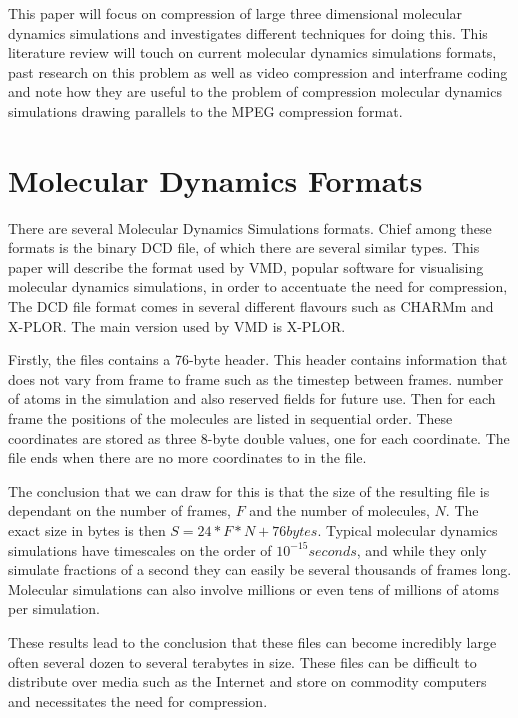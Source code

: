 \documentclass[twocolumn, a4paper,10pt]{article}
\begin{document}
This paper will focus on compression of large three dimensional molecular dynamics simulations and investigates different techniques for doing this. This literature review will touch on current molecular dynamics simulations formats, past research on this problem as well as video compression and interframe coding and note how they are useful to the problem of compression molecular dynamics simulations drawing parallels to the MPEG compression format. 

\section*{Molecular Dynamics Formats}

There are several Molecular Dynamics Simulations formats. Chief among these formats is the binary DCD file, of which there are several similar types. This paper will describe the format  used by VMD, popular software for visualising molecular dynamics simulations\cite{vmd}, in order to accentuate the need for compression, The DCD file format comes in several different flavours such as CHARMm and X-PLOR. The main version used by VMD is X-PLOR\cite{vmddcdformat}.

Firstly, the files contains a 76-byte header. This header contains information that does not vary from frame to frame such as the timestep between frames. number of atoms in the simulation and also reserved fields for future use. Then for each frame the positions of the molecules are listed in sequential order. These coordinates are stored as three 8-byte double values, one for each coordinate. The file ends when there are no more coordinates to in the file.

The conclusion that we can draw for this is that the size of the resulting file is dependant on the number of frames, $F$ and the number of molecules, $N$. The exact size in bytes is then $S = 24*F*N + 76 bytes$. Typical molecular dynamics simulations have timescales on the order of $10^{-15} seconds$, and while they only simulate fractions of a second they can easily be several thousands of frames long. Molecular simulations can also involve millions or even tens of millions of atoms per simulation. 

These results lead to the conclusion that these files can become incredibly large often several dozen to several terabytes in size. These files can be difficult to distribute over media such as the Internet and store on commodity computers and necessitates the need for compression.
\end{document}
